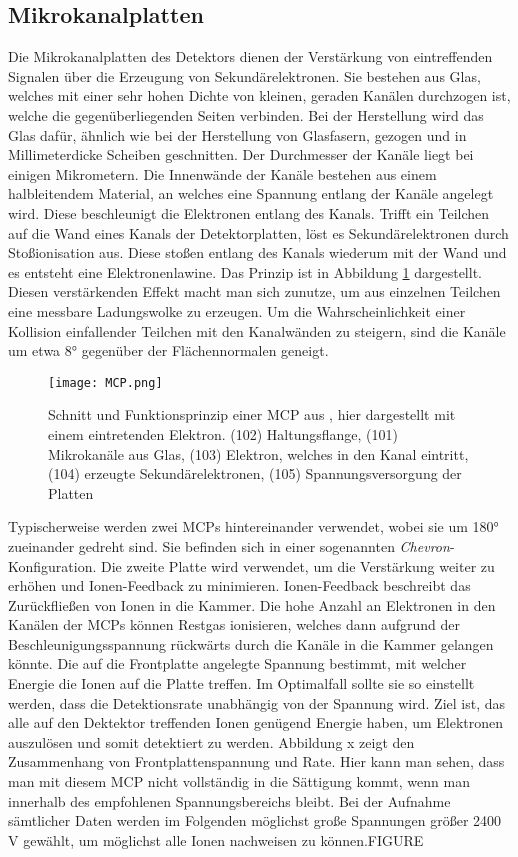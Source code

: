 \subsection{Mikrokanalplatten}
Die Mikrokanalplatten des Detektors dienen der Verstärkung von eintreffenden Signalen über die Erzeugung von Sekundärelektronen. Sie bestehen aus Glas, welches mit einer sehr hohen Dichte von kleinen, geraden Kanälen durchzogen ist, welche die gegenüberliegenden Seiten verbinden. Bei der Herstellung wird das Glas dafür, ähnlich wie bei der Herstellung von Glasfasern, gezogen und in Millimeterdicke Scheiben geschnitten. Der Durchmesser der Kanäle liegt bei einigen Mikrometern. Die Innenwände der Kanäle bestehen aus einem halbleitendem Material, an welches eine Spannung entlang der Kanäle angelegt wird. Diese beschleunigt die Elektronen entlang des Kanals. Trifft ein Teilchen auf die Wand eines Kanals der Detektorplatten, löst es Sekundärelektronen durch Stoßionisation aus. Diese stoßen entlang des Kanals wiederum mit der Wand und es entsteht eine Elektronenlawine. Das Prinzip ist in Abbildung \ref{fig:MCP} dargestellt. Diesen verstärkenden Effekt macht man sich zunutze, um aus einzelnen Teilchen eine messbare Ladungswolke zu erzeugen. Um die Wahrscheinlichkeit einer Kollision einfallender Teilchen mit den Kanalwänden zu steigern, sind die Kanäle um etwa \ang{8} gegenüber der Flächennormalen geneigt. 

\begin{figure}
    \centering
    \texttt{[image: MCP.png]}
    \caption[Schnitt und Funktionsprinzip einer MCP]{Schnitt und Funktionsprinzip einer MCP aus \cite{MCP}, hier dargestellt mit einem eintretenden Elektron. (102) Haltungsflange, (101) Mikrokanäle aus Glas, (103) Elektron, welches in den Kanal eintritt, (104) erzeugte Sekundärelektronen, (105) Spannungsversorgung der Platten}
    \label{fig:MCP} 
\end{figure}

Typischerweise werden zwei MCPs hintereinander verwendet, wobei sie um \ang{180} zueinander gedreht sind. Sie befinden sich in einer sogenannten \textit{Chevron}-Konfiguration. Die zweite Platte wird verwendet, um die Verstärkung weiter zu erhöhen und Ionen-Feedback zu minimieren. Ionen-Feedback beschreibt das Zurückfließen von Ionen in die Kammer. Die hohe Anzahl an Elektronen in den Kanälen der MCPs können Restgas ionisieren, welches dann aufgrund der Beschleunigungsspannung rückwärts durch die Kanäle in die Kammer gelangen könnte. Die auf die Frontplatte angelegte Spannung bestimmt, mit welcher Energie die Ionen auf die Platte treffen. Im Optimalfall sollte sie so einstellt werden, dass die Detektionsrate unabhängig von der Spannung wird. Ziel ist, das alle auf den Dektektor treffenden Ionen genügend Energie haben, um Elektronen auszulösen und somit detektiert zu werden. Abbildung x zeigt den Zusammenhang von Frontplattenspannung und Rate. Hier kann man sehen, dass man mit diesem MCP nicht vollständig in die Sättigung kommt, wenn man innerhalb des empfohlenen Spannungsbereichs bleibt. Bei der Aufnahme sämtlicher Daten werden im Folgenden möglichst große Spannungen größer 2400 V gewählt, um möglichst alle Ionen nachweisen zu können.FIGURE

